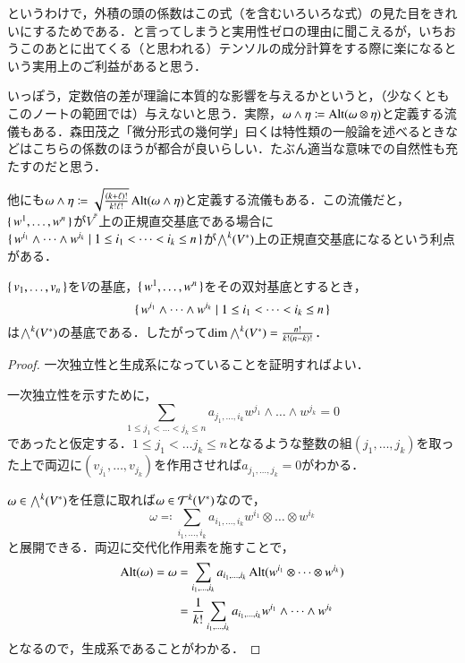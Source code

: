 \begin{dig}
というわけで，外積の頭の係数はこの式（を含むいろいろな式）の見た目をきれいにするためである．と言ってしまうと実用性ゼロの理由に聞こえるが，いちおうこのあとに出てくる（と思われる）テンソルの成分計算をする際に楽になるという実用上のご利益があると思う．
\end{dig}

\begin{que}[*]
いっぽう，定数倍の差が理論に本質的な影響を与えるかというと，（少なくともこのノートの範囲では）与えないと思う．実際，$\omega \wedge \eta \coloneqq \operatorname{Alt} (\omega \otimes \eta)$と定義する流儀もある．森田茂之「微分形式の幾何学」曰くは特性類の一般論を述べるときなどはこちらの係数のほうが都合が良いらしい．たぶん適当な意味での自然性も充たすのだと思う．

他にも$\omega \wedge \eta \coloneqq \sqrt{\frac{(k+\ell)!}{k!\ell!}} \operatorname{Alt} (\omega \wedge \eta)$と定義する流儀もある．この流儀だと，$\set{w^1, \dots, w^n}$が$V^*$上の正規直交基底である場合に$\set{w^{i_1} \wedge \dots \wedge w^{i_k} | 1 \leq i_1 < \dots < i_k \leq n}$が$\bigwedge^k(V^*)$上の正規直交基底になるという利点がある．
\end{que}

\begin{thm}
$\set{v_1, \dots, v_n}$を$V$の基底，$\set{w^1, \dots, w^n}$をその双対基底とするとき，
\begin{equation}
\set{w^{i_1} \wedge \dots \wedge w^{i_k} | 1 \leq i_1 < \dots < i_k \leq n}
\end{equation}は$\bigwedge^k(V^*)$の基底である．したがって$\dim \bigwedge^k(V^*) = \frac{n!}{k!(n-k)!}$．
\end{thm}

\begin{proof}
一次独立性と生成系になっていることを証明すればよい．

一次独立性を示すために，
\begin{equation}
\sum_{1 \leq j_1 < \dots < j_k \leq n} a_{j_1,\dots,i_k} w^{j_1} \wedge \dots \wedge w^{j_k} = 0
\end{equation}であったと仮定する．$1 \leq j_1 < \dots j_k \leq n$となるような整数の組$(j_1, \dots, j_k)$を取った上で両辺に$(v_{j_1}, \dots, v_{j_k})$を作用させれば$a_{j_1,\dots,j_k}=0$がわかる．

$\omega \in \bigwedge^k(V^*)$を任意に取れば$\omega \in \mathcal{T}^k(V^*)$なので，
\begin{equation}
\omega \eqqcolon \sum_{i_1, \dots, i_k} a_{i_1,\dots,i_k} w^{i_1} \otimes \dots \otimes w^{i_k}
\end{equation}と展開できる．両辺に交代化作用素を施すことで，
\begin{align}
\operatorname{Alt}(\omega) = \omega &= \sum_{i_1, \dots, i_k} a_{i_1,\dots,i_k} \operatorname{Alt}(w^{i_1} \otimes \dots \otimes w^{i_k}) \\
&= \frac{1}{k!} \sum_{i_1, \dots, i_k} a_{i_1,\dots,i_k} w^{i_1} \wedge \dots \wedge w^{i_k}
\end{align}となるので，生成系であることがわかる．
\end{proof}

